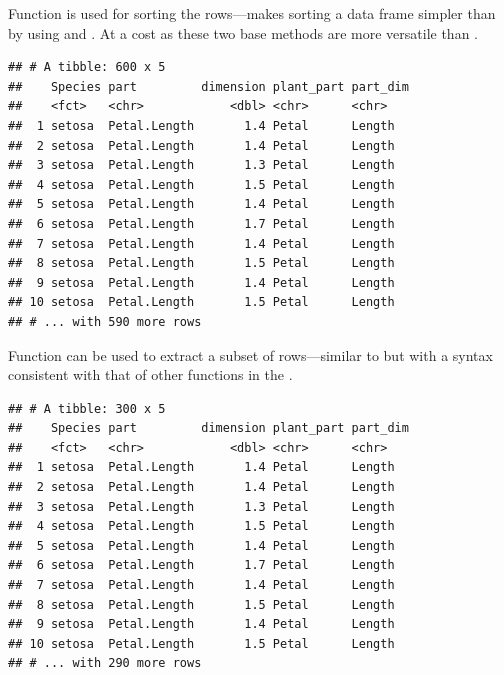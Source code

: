 \documentclass[krantz2]{krantz}\usepackage{knitr}%
\begin{document}
Function  is used for sorting the rows---makes sorting a data frame simpler than by using  and . At a cost as these two base \Rlang methods are more versatile than .

\begin{knitrout}\footnotesize
{}\color{fgcolor}\begin{kframe}
\begin{alltt}
\end{alltt}
\begin{verbatim}
## # A tibble: 600 x 5
##    Species part         dimension plant_part part_dim
##    <fct>   <chr>            <dbl> <chr>      <chr>   
##  1 setosa  Petal.Length       1.4 Petal      Length  
##  2 setosa  Petal.Length       1.4 Petal      Length  
##  3 setosa  Petal.Length       1.3 Petal      Length  
##  4 setosa  Petal.Length       1.5 Petal      Length  
##  5 setosa  Petal.Length       1.4 Petal      Length  
##  6 setosa  Petal.Length       1.7 Petal      Length  
##  7 setosa  Petal.Length       1.4 Petal      Length  
##  8 setosa  Petal.Length       1.5 Petal      Length  
##  9 setosa  Petal.Length       1.4 Petal      Length  
## 10 setosa  Petal.Length       1.5 Petal      Length  
## # ... with 590 more rows
\end{verbatim}
\end{kframe}
\end{knitrout}

Function  can be used to extract a subset of rows---similar to  but with a syntax consistent with that of other functions in the .

\begin{knitrout}\footnotesize
{}\color{fgcolor}\begin{kframe}
\begin{alltt}
 \hlopt{==} \hlstd{)}
\end{alltt}
\begin{verbatim}
## # A tibble: 300 x 5
##    Species part         dimension plant_part part_dim
##    <fct>   <chr>            <dbl> <chr>      <chr>   
##  1 setosa  Petal.Length       1.4 Petal      Length  
##  2 setosa  Petal.Length       1.4 Petal      Length  
##  3 setosa  Petal.Length       1.3 Petal      Length  
##  4 setosa  Petal.Length       1.5 Petal      Length  
##  5 setosa  Petal.Length       1.4 Petal      Length  
##  6 setosa  Petal.Length       1.7 Petal      Length  
##  7 setosa  Petal.Length       1.4 Petal      Length  
##  8 setosa  Petal.Length       1.5 Petal      Length  
##  9 setosa  Petal.Length       1.4 Petal      Length  
## 10 setosa  Petal.Length       1.5 Petal      Length  
## # ... with 290 more rows
\end{verbatim}
\end{kframe}
\end{knitrout}
\end{document}
